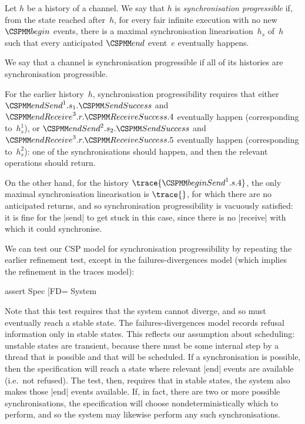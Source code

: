 
\begin{definition}
Let $h$ be a history of a channel.  We say that $h$ is \emph{synchronisation
  progressible} if, from the state reached after~$h$, for every fair infinite
execution with no new $\Begin$ events, there is a maximal synchronisation
  linearisation~$h_s$ of~$h$ such that every anticipated $\End$ event~$e$
  eventually happens.

We say that a channel is synchronisation progressible if all of its histories
are synchronisation progressible.
\end{definition}

For the earlier history~$h$, synchronisation progressibility requires that
either $\endSend^1.s_1.\SendSuccess$ and $\endReceive^3.r.\ReceiveSuccess.4$
eventually happen (corresponding to~$h_s^1$), or $\endSend^2.s_2.\SendSuccess$
and $\endReceive^3.r.\ReceiveSuccess.5$ eventually happen (corresponding
to~$h_s^2$): one of the synchronisations should happen, and then the relevant
operations should return.

On the other hand, for the history $\trace{\beginSend^1.s.4}$, the only
maximal synchronisation linearisation is $\trace{}$, for which there are no
anticipated returns, and so synchronisation progressibility is vacuously
satisfied: it is fine for the |send| to get stuck in this case, since there is
no |receive| with which it could synchronise.



We can test our CSP model for synchronisation progressibility by repeating the
earlier refinement test, except in the failures-divergences model (which
implies the refinement in the traces model):
%
\begin{cspm}
assert Spec [FD= System
\end{cspm}
%
Note that this test requires that the system cannot diverge, and so must
eventually reach a stable state.  The failures-divergences model records
refusal information only in stable states.  This reflects our assumption about
scheduling: unstable states are transient, because there must be some internal
step by a thread that is possible and that will be scheduled.  If a
synchronisation is possible, then the specification will reach a state where
relevant |end| events are available (i.e.~not refused).  The test, then,
requires that in stable states, the system also makes those |end| events
available.  If, in fact, there are two or more possible synchronisations, the
specification will choose nondeterministically which to perform, and so the
system may likewise perform any such synchronisations.

